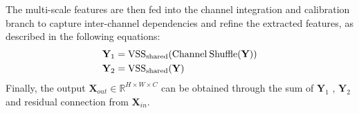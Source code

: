 \documentclass[conference]{IEEEtran}
\begin{document}

The multi-scale features are then fed into the channel integration and calibration branch to capture inter-channel dependencies and refine the extracted features, as described in the following equations: 
\begin{equation}
\begin{aligned} 
\textbf{Y}_{1}&=\text{VSS}_{\text{shared}}(\text{Channel\:Shuffle}(\textbf{Y}))\\
\textbf{Y}_{2} &=\text{VSS}_\text{shared}(\textbf{Y})
\end{aligned} 
\end{equation}
Finally, the output $\textbf{X}_{out} \in \mathbb{R}^{H \times {W} \times {C}}$ can be obtained through the sum of $\textbf{Y}_{1}$ , $\textbf{Y}_{2}$  and residual connection from  $\textbf{X}_{in}$.
\end{document}
